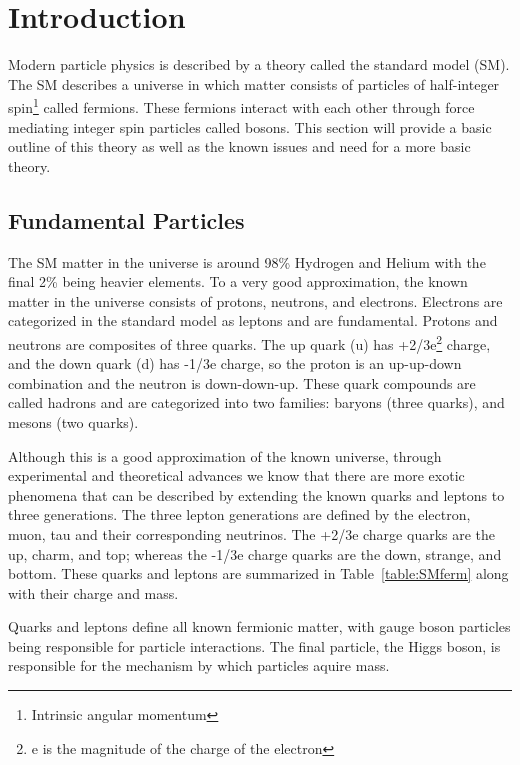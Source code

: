 \chapter{Introduction}
\label{sec:intro}
Modern particle physics is described by a theory called the standard model (SM).  
The SM describes a universe in which matter consists of particles of half-integer spin\footnote{Intrinsic angular momentum} called fermions.  
These fermions interact with each other through force mediating integer spin particles called bosons.  
This section will provide a basic outline of this theory as well as the known issues and need for a more basic theory.

\section{Fundamental Particles}
The SM matter in the universe is around 98\% Hydrogen and Helium with the final 2\% being heavier elements.  
To a very good approximation, the known matter in the universe consists of protons, neutrons, and electrons.  
Electrons are categorized in the standard model as leptons and are fundamental.  
Protons and neutrons are composites of three quarks.  
The up quark (u) has +2/3e\footnote{e is the magnitude of the charge of the electron} charge, and the down quark (d) has -1/3e charge, so the proton is an up-up-down combination and the neutron is down-down-up.  
These quark compounds are called hadrons and are categorized into two families: baryons (three quarks), and mesons (two quarks).

Although this is a good approximation of the known universe, through experimental and theoretical advances we know that there are 
more exotic phenomena that can be described by extending the known quarks and leptons to three generations.  
The three lepton generations are defined by the electron, muon, tau and their corresponding neutrinos.
The +2/3e charge quarks are the up, charm, and top; whereas the -1/3e charge quarks are the down, strange, and bottom.  
These quarks and leptons are summarized in Table~\ref{table:SMferm} along with their charge and mass.
    
Quarks and leptons define all known fermionic matter, with gauge boson particles being responsible for particle interactions.  
The final particle, the Higgs boson, is responsible for the mechanism by which particles aquire mass.  
    

